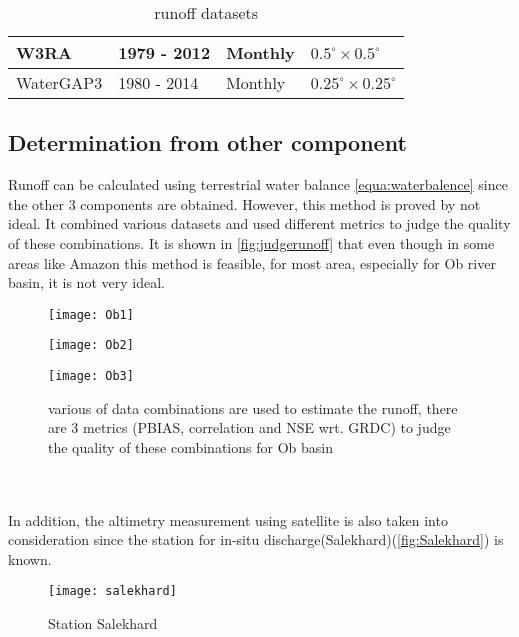 \begin{table}[htbp]
\begin{tabular}{llll}
		\multicolumn{1}{|l|}{W3RA}       & \multicolumn{1}{l|}{1979 - 2012} & \multicolumn{1}{l|}{Monthly}             & \multicolumn{1}{l|}{$0.5^{\circ} \times 0.5^{\circ}$}                      \\ \hline
		\multicolumn{1}{|l|}{WaterGAP3}       & \multicolumn{1}{l|}{1980 - 2014} & \multicolumn{1}{l|}{Monthly}             & \multicolumn{1}{l|}{$0.25^{\circ} \times 0.25^{\circ}$}                       \\ \hline
	\end{tabular}
	\caption{runoff datasets}
	\label{tab:runoff}
\end{table}
\subsection{Determination from other component}
Runoff can be calculated using terrestrial water balance \autoref{equa:waterbalence} since the other 3 components are obtained. However, this method is proved by \cite{lorenz2014large} not ideal. It combined various datasets and used different metrics to judge the quality of these combinations. It is shown in \autoref{fig:judgerunoff} that even though in some areas like Amazon this method is feasible, for most area, especially for Ob river basin, it is not very ideal. 
\begin{figure}[htbp]\centering
	\begin{minipage}[t]{0.8\textwidth}
		\centering
		\texttt{[image: Ob1]} %
	\end{minipage}
	\begin{minipage}[t]{0.85\textwidth}
		\centering
		\texttt{[image: Ob2]} %
	\end{minipage}
	\begin{minipage}[t]{0.85\textwidth}
		\centering
		\texttt{[image: Ob3]} %
	\end{minipage}
	\caption{various of data combinations are used to estimate the runoff, there are 3 metrics (PBIAS, correlation and NSE wrt. GRDC) to judge the quality of these combinations for Ob basin}
	\label{fig:judgerunoff}
\end{figure}\\\\
In addition, the altimetry measurement using satellite is also taken into consideration since the station for in-situ discharge(Salekhard)(\autoref{fig:Salekhard}) is known. 
\begin{figure}[htbp]
	\centering
	\texttt{[image: salekhard]} %
	\caption{Station Salekhard} 
	\label{fig:Salekhard}
\end{figure}
